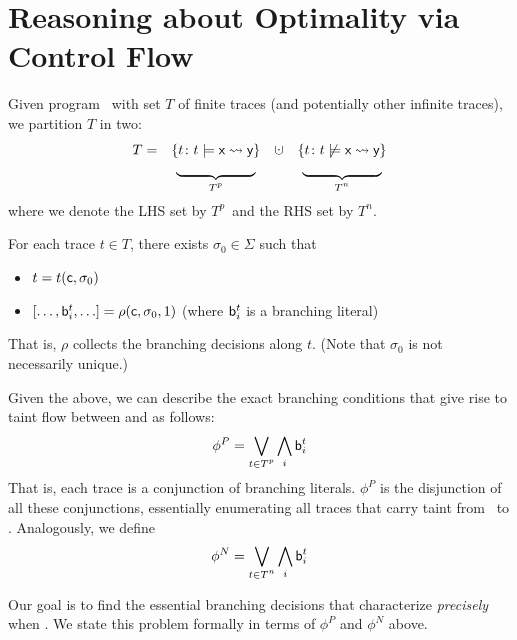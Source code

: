 \documentclass[]{article}
\begin{document}
\newcommand{\cupdot}{\mathbin{\mathaccent\cdot\cup}}

\newcommand{\Tp}{\textnormal{$T^p$}}
\newcommand{\Tn}{\textnormal{$T^n$}}

\section{Reasoning about Optimality via Control Flow}

Given program \prog\ with set $T$ of finite traces (and potentially other infinite traces), we partition $T$ in two:
$$
\begin{array}{rccc}
T = & \{ t \colon t \models \query{\xvar}{\yvar} \} & \cupdot & \{ t \colon t \not\models \query{\xvar}{\yvar} \} \\
     &  \underbrace{~~~~~~~~~~~~~~~~~}_{\Tp}  &    & \underbrace{~~~~~~~~~~~~~~~~~}_{\Tn} \\
\end{array}
$$
where we denote the LHS set by \Tp\ and the RHS set by \Tn.

For each trace $t \in T$, there exists $\sigma_0 \in \Sigma$ such that
\begin{itemize}
	\item $t=t({\sf c},\sigma_0)$
	\item $[ \ldots, {\sf b}^t_i, \ldots ] = \rho({\sf c},\sigma_0,1)$ (where ${\sf b}^t_i$ is a branching literal)
\end{itemize}
That is, $\rho$ collects the branching decisions along $t$. (Note that $\sigma_0$ is not necessarily unique.)

Given the above, we can describe the exact branching conditions that give rise to taint flow between \xvar and \yvar as follows:
\begin{equation}\label{Eq:preciseCond}
	\phi^P = \bigvee_{t \in \Tp} \bigwedge_i {\sf b}^t_i 
\end{equation}
That is, each trace is a conjunction of branching literals. $\phi^P$ is the disjunction of all these conjunctions, essentially enumerating all traces that carry taint from \xvar\ to \yvar.
Analogously, we define
\begin{equation}\label{Eq:preciseNegCond}
	\phi^N = \bigvee_{t \in \Tn} \bigwedge_i {\sf b}^t_i 
\end{equation}

Our goal is to find the essential branching decisions that characterize \emph{precisely} when \query{\xvar}{\yvar}. We state this problem formally in terms of $\phi^P$ and $\phi^N$ above.
\end{document}
